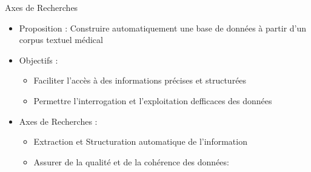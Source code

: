 \documentclass[english,french,table,aspectratio=43]{beamer}
\renewcommand{\_}{\ifincsname_\else\legacyunderscore\fi}
\begin{document}
\begin{frame}{Axes de Recherches}
  \begin{itemize}
      \item Proposition : Construire automatiquement une base de données à partir d'un corpus textuel médical
      \item Objectifs :
      \begin{itemize}
          \item Faciliter l'accès à des informations précises et structurées
          \item Permettre l'interrogation et l'exploitation defficaces des données
      \end{itemize}
      \vfill\pause
      \item Axes de Recherches :
      \begin{itemize}
          \item Extraction et Structuration automatique de l'information
          \item Assurer de la qualité et de la cohérence des données:
      \end{itemize}
  \end{itemize}
\end{frame}



\end{document}
